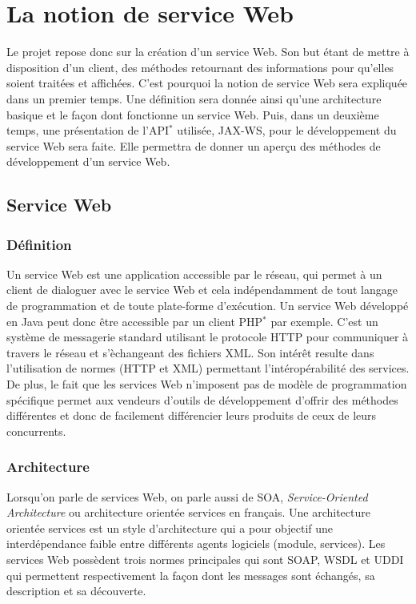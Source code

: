 \chapter{La notion de service Web}
\label{section:serviceWeb}

Le projet repose donc sur la cr\'eation d'un service Web.
Son but \'etant de mettre \`a disposition d'un client, des m\'ethodes retournant des informations pour qu'elles soient trait\'ees et affich\'ees.
C'est pourquoi la notion de service Web sera expliqu\'ee dans un premier temps.
Une d\'efinition sera donn\'ee ainsi qu'une architecture basique et le fa\c{c}on dont fonctionne un service Web.
Puis, dans un deuxi\`eme temps, une pr\'esentation de l'API$^*$ utilis\'ee, JAX-WS, pour le d\'eveloppement du service Web sera faite.
Elle permettra de donner un aper\c{c}u des m\'ethodes de d\'eveloppement d'un service Web.

\section{Service Web}

\subsection{D\'efinition}

Un service Web est une application accessible par le r\'eseau, qui permet \`a un client de dialoguer avec le service Web et cela ind\'ependamment de tout langage de programmation et de toute plate-forme d'ex\'ecution.
Un service Web d\'evelopp\'e en Java peut donc \^etre accessible par un client PHP$^*$ par exemple.
C'est un syst\`eme de messagerie standard utilisant le protocole HTTP pour communiquer \`a travers le r\'eseau et s'\`echangeant des fichiers XML.
Son int\'er\^et resulte dans l'utilisation de normes (HTTP et XML) permettant l'int\'erop\'erabilit\'e des services.
De plus, le fait que les services Web n'imposent pas de mod\`ele de programmation sp\'ecifique permet aux vendeurs d'outils de d\'eveloppement d'offrir des m\'ethodes diff\'erentes et donc de facilement diff\'erencier leurs produits de ceux de leurs concurrents.

\subsection{Architecture}

Lorsqu'on parle de services Web, on parle aussi de SOA, \textit{Service-Oriented Architecture} ou architecture orient\'ee services en fran\c{c}ais.
Une architecture orient\'ee services est un style d'architecture qui a pour objectif une interd\'ependance faible entre diff\'erents agents logiciels (module, services).
Les services Web poss\`edent trois normes principales qui sont SOAP, WSDL et UDDI qui permettent respectivement la fa\c{c}on dont les messages sont \'echang\'es, sa description et sa d\'ecouverte.

